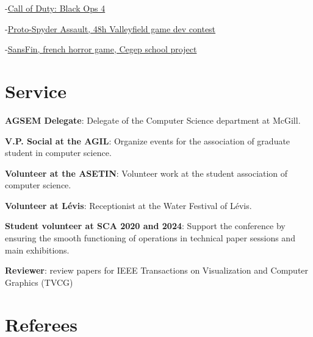 \documentclass[10pt]{article} %
\begin{document}
{
-\href{https://www.callofduty.com/ca/en/blackops4}{Call of Duty: Black Ops 4}

-\href{https://youtu.be/qJjy8b0kuSY}{Proto-Spyder Assault, 48h Valleyfield game dev contest}

-\href{https://youtu.be/s6vr07Nt1IY}{SansFin, french horror game, Cegep school project}
}

\section{Service}
\textbf{AGSEM Delegate}: Delegate of the Computer Science department at McGill.

\noindent\textbf{V.P. Social at the AGIL}: Organize events for the association of graduate student in computer science.

\noindent\textbf{Volunteer at the ASETIN}: Volunteer work at the student association of computer science. 

\noindent\textbf{Volunteer at Lévis}: Receptionist at the Water Festival of Lévis.

\noindent\textbf{Student volunteer at SCA 2020 and 2024}: Support the conference by ensuring the smooth functioning of operations in technical paper sessions and main exhibitions.

\noindent\textbf{Reviewer}: review papers for IEEE Transactions on Visualization and Computer Graphics (TVCG)


\section{Referees}

\end{document}

